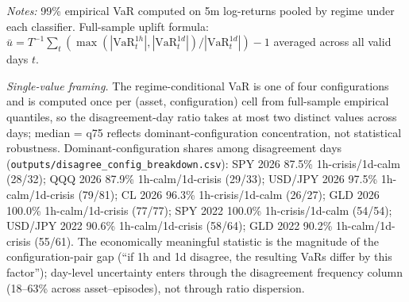 \documentclass[preprint,12pt,authoryear]{elsarticle}
\begin{document}
\begin{table}[H]
\centering
\small
\setlength{\tabcolsep}{4pt}
\caption{Resolution-conditional 99\% empirical-VaR uplift on 1h-vs-1d disagreement days.}
\label{tab:var_uplift}
\par\medskip
{\footnotesize\justifying
\textit{Notes:} 99\% empirical VaR computed on 5m log-returns pooled by regime under each classifier. Full-sample uplift formula: $\bar{u} = T^{-1}\sum_t (\max(|\text{VaR}^{1h}_t|,|\text{VaR}^{1d}_t|)/|\text{VaR}^{1d}_t|) - 1$ averaged across all valid days $t$.

\emph{Single-value framing.} The regime-conditional VaR is one of four configurations and is computed once per (asset, configuration) cell from full-sample empirical quantiles, so the disagreement-day ratio takes at most two distinct values across days; median = q75 reflects dominant-configuration concentration, not statistical robustness. Dominant-configuration shares among disagreement days (\texttt{outputs/disagree\_config\_breakdown.csv}): SPY 2026 87.5\% 1h-crisis/1d-calm (28/32); QQQ 2026 87.9\% 1h-calm/1d-crisis (29/33); USD/JPY 2026 97.5\% 1h-calm/1d-crisis (79/81); CL 2026 96.3\% 1h-crisis/1d-calm (26/27); GLD 2026 100.0\% 1h-calm/1d-crisis (77/77); SPY 2022 100.0\% 1h-crisis/1d-calm (54/54); USD/JPY 2022 90.6\% 1h-calm/1d-crisis (58/64); GLD 2022 90.2\% 1h-calm/1d-crisis (55/61). The economically meaningful statistic is the magnitude of the configuration-pair gap (``if 1h and 1d disagree, the resulting VaRs differ by this factor''); day-level uncertainty enters through the disagreement frequency column (18--63\% across asset--episodes), not through ratio dispersion.

}
\end{table}
\end{document}
